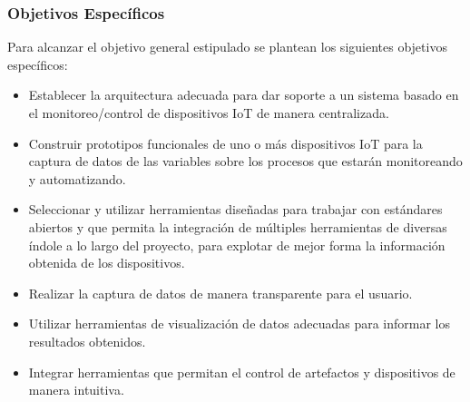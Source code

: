 \subsubsection{Objetivos Específicos}
Para alcanzar el objetivo general estipulado se plantean los siguientes objetivos específicos:
\begin{itemize} 
\item Establecer la arquitectura adecuada para dar soporte a un sistema basado en el monitoreo/control de dispositivos IoT de manera centralizada.
\item Construir prototipos funcionales de uno o más dispositivos IoT para la captura de datos de las variables sobre los procesos que estarán monitoreando y automatizando.
\item Seleccionar y utilizar herramientas diseñadas para trabajar con estándares abiertos y que permita la integración de múltiples herramientas de diversas índole a lo largo del proyecto, para explotar de mejor forma la información obtenida de los dispositivos.
\item Realizar la captura de datos de manera transparente para el usuario.
\item Utilizar herramientas de visualización de datos adecuadas para informar los resultados obtenidos.
\item Integrar herramientas que permitan el control de artefactos y dispositivos de manera intuitiva.
\end{itemize}
